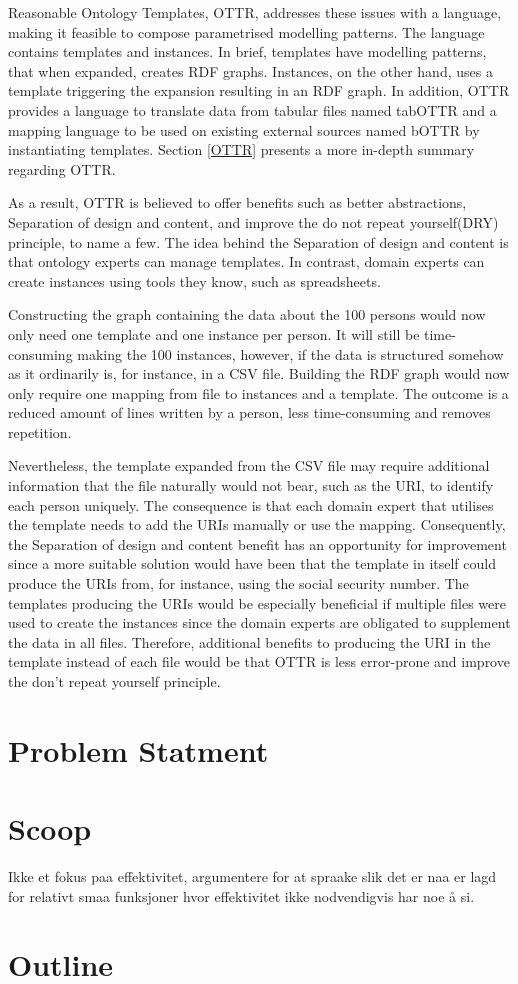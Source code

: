 \para
Reasonable Ontology Templates, OTTR\cite{OTTR_online}, addresses these issues with a language, making it feasible to compose parametrised modelling patterns. The language contains templates and instances. In brief, templates have modelling patterns, that when expanded, creates RDF graphs. Instances, on the other hand, uses a template triggering the expansion resulting in an RDF graph. In addition, OTTR provides a language to translate data from tabular files named tabOTTR\cite{OTTR_tabOTTR} and a mapping language to be used on existing external sources named bOTTR \cite{OTTR_bOTTR} by instantiating templates. Section \ref{OTTR} presents a more in-depth summary regarding OTTR.

\para
As a result, OTTR is believed to offer benefits such as better abstractions, Separation of design and content, and improve the do not repeat yourself(DRY) principle, to name a few\cite{OTTR_online_benefits}. The idea behind the Separation of design and content is that ontology experts can manage templates. In contrast, domain experts can create instances using tools they know, such as spreadsheets\cite{OTTR_online_benefits}. 

\para
Constructing the graph containing the data about the 100 persons would now only need one template and one instance per person. It will still be time-consuming making the 100 instances, however, if the data is structured somehow as it ordinarily is, for instance, in a CSV file. Building the RDF graph would now only require one mapping from file to instances and a template. The outcome is a reduced amount of lines written by a person, less time-consuming and removes repetition. 

\para
Nevertheless, the template expanded from the CSV file may require additional information that the file naturally would not bear, such as the URI, to identify each person uniquely. The consequence is that each domain expert that utilises the template needs to add the URIs manually or use the mapping.  Consequently, the Separation of design and content benefit has an opportunity for improvement since a more suitable solution would have been that the template in itself could produce the URIs from, for instance, using the social security number. The templates producing the URIs would be especially beneficial if multiple files were used to create the instances since the domain experts are obligated to supplement the data in all files.  Therefore, additional benefits to producing the URI in the template instead of each file would be that OTTR is less error-prone and improve the don't repeat yourself principle.

\section{Problem Statment}

\section{Scoop}
Ikke et fokus paa effektivitet, argumentere for at spraake slik det er naa er lagd for relativt smaa funksjoner hvor effektivitet ikke nodvendigvis har noe å si. 
\section{Outline}
